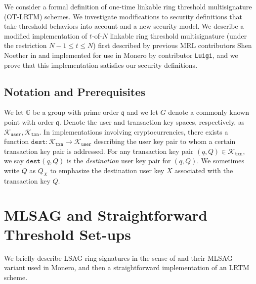 \documentclass{mrl}
\theoremstyle{definition}
\begin{document}
We consider a formal definition of one-time linkable ring threshold multisignature (OT-LRTM) schemes. We investigate modifications to security definitions that take threshold behaviors into account and a new security model. We describe a modified implementation of $t$-of-$N$ linkable ring threshold multisignature (under the restriction $N-1 \leq t \leq N$) first described by previous MRL contributors Shen Noether in \cite{noether2016ring} and implemented for use in Monero by contributor \texttt{Luigi}, and we prove that this implementation satisfies our security definitions.


\subsection{Notation and Prerequisites}

We let $\mathbb{G}$ be a group with prime order $\mathfrak{q}$ and we let $G$ denote a commonly known point with order $\mathfrak{q}$. Denote the user and transaction key spaces, respectively, as $\mathcal{K}_{\texttt{user}}, \mathcal{K}_{\texttt{txn}}$. In implementations involving cryptocurrencies, there exists a function $\texttt{dest}:\mathcal{K}_{\texttt{txn}} \to \mathcal{K}_{\texttt{user}}$ describing the user key pair to whom a certain transaction key pair is addressed. For any transaction key pair $(q,Q) \in \mathcal{K}_{\texttt{txn}}$, we say $\texttt{dest}(q,Q)$ is the \textit{destination} user key pair for $(q,Q)$. We sometimes write $Q$ as $Q_X$ to emphasize the destination user key $X$ associated with the transaction key $Q$.


\section{MLSAG and Straightforward Threshold Set-ups}


We briefly describe LSAG ring signatures in the sense of \cite{liu2004linkable} and their MLSAG variant used in Monero, and then a straightforward implementation of an LRTM scheme. 
\end{document}
